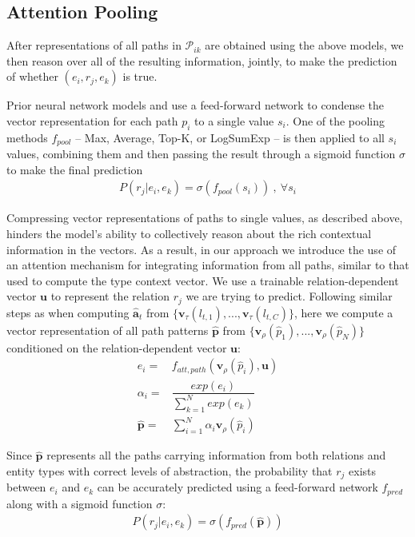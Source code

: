 \documentclass[letterpaper]{article} %
\begin{document}
\subsection{Attention Pooling}

After representations of all paths in $\mathcal{P}_{ik}$ are obtained using the above models, we then reason over all of the resulting information, jointly, to make the prediction of whether $(e_i, r_j, e_k)$ is true.

Prior neural network models \cite{cvsm} and \cite{chains} use a feed-forward network to condense the vector representation for each path $p_i$ to a single value $s_i$. One of the pooling methods $f_{pool}$ -- Max, Average, Top-K, or LogSumExp -- is then applied to all $s_i$ values, combining them and then passing the result through a sigmoid function $\sigma$ to make the final prediction%
\begin{align}
	P(r_j|e_i, e_k) = \sigma (f_{pool}(s_i))\:,\: \forall s_i
\end{align} %

Compressing vector representations of paths to single values, as described above, hinders the model's ability to collectively reason about the rich contextual information in the vectors.  As a result, in our approach we introduce the use of an attention mechanism for integrating information from all paths, similar to that used to compute the type context vector. We use a trainable relation-dependent vector $\bm{u}$ to represent the relation $r_j$ we are trying to predict. Following similar steps as when computing $\hat{\mathbf{a}}_t$ from $\{\bm{v}_\tau(l_{t,1}),...,\bm{v}_\tau(l_{t,C})\}$, here we compute a vector representation of all path patterns $\hat{\mathbf{p}}$ from $\{ \bm{v}_\rho(\hat{p}_1),...,\bm{v}_\rho(\hat{p}_N) \}$ conditioned on the relation-dependent vector $\bm{u}$:%
\begin{align}
	e_{i} =& f_{att, path}(\bm{v}_\rho(\hat{p}_i), \bm{u}) \\
	\alpha_{i} =& \dfrac{exp(e_{i})}{\sum_{k=1}^{N} exp(e_{k})} \\
	\hat{\mathbf{p}} =& \sum_{i=1}^{N} \alpha_{i} \bm{v}_\rho(\hat{p}_i)
\end{align} %

Since $\hat{\mathbf{p}}$ represents all the paths carrying information from both relations and entity types with correct levels of abstraction, the probability that $r_j$ exists between $e_i$ and $e_k$ can be accurately predicted using a feed-forward network $f_{pred}$ along with a sigmoid function $\sigma$: %
\begin{align}
	P(r_j|e_i, e_k) = \sigma (f_{pred}(\hat{\mathbf{p}}))
\end{align} %
\end{document}
